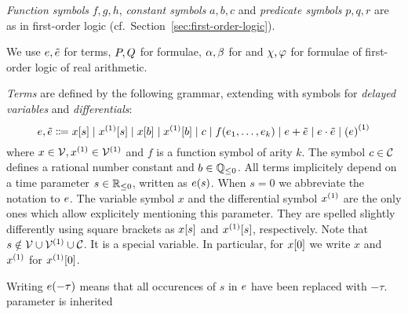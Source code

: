     \emph{Function symbols} $f,g,h$, \emph{constant symbols} $a,b,c$ and \emph{predicate symbols} $p,q,r$ are as in first-order logic (cf.\ Section~\ref{sec:first-order-logic}).

    We use $e,\tilde{e}$ for \ddL terms, $P,Q$ for \ddL formulae, $\alpha,\beta$ for \dHPs and $\chi,\varphi$ for formulae of first-order logic of real arithmetic.


    \begin{definition}[Terms]\label{def:syntax-terms}
        \emph{Terms} are defined by the following grammar, extending \dL with symbols for \emph{delayed variables} and \emph{differentials}:
        \begin{equation*}
            \astrm,\bstrm \Coloneqq
                \xtau[s] \mid
                \Dxtau[s] \mid
                \xtau[b] \mid
                \Dxtau[b] \mid
                c \mid
                f(\range{\istrm{1}}{\istrm{k}}) \mid
                \astrm + \bstrm \mid
                \astrm \cdot \bstrm \mid
                \D{(\astrm)}
        \end{equation*}
        where $x\in\allvars,\D{x}\in\diffvars$ and $f$ is a function symbol of arity $k$.
        The symbol $c\in\mathcal{C}_{}$ defines a rational number constant and $b\in\mathbb{Q}_{\leq 0}$.
        All terms implicitely depend on a time parameter $s\in\mathbb{R}_{\leq 0}$, written as $e(s)$. When $s=0$ we abbreviate the notation to $e$.
        The variable symbol $x$ and the differential symbol $\D{x}$ are the only ones which allow explicitely mentioning this parameter. They are spelled slightly differently using square brackets as $x[s]$ and $\Dxtau[s]$, respectively. Note that $s\notin\allvars\cup\diffvars\cup\constants$. It is a special variable.
        In particular, for $x[0]$ we write $x$ and $\D{x}$ for $\Dxtau[0]$.

        Writing $e(-\tau)$ means that all occurences of $s$ in $e$ have been replaced with $-\tau$.
        parameter is inherited


    \end{definition}

